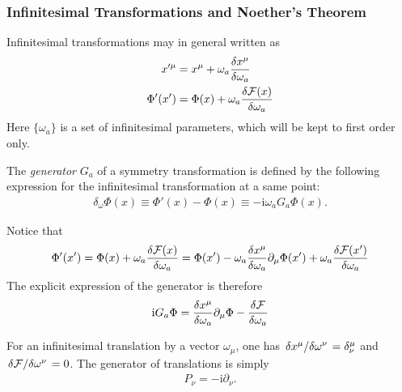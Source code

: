 \documentclass[10pt]{article}
\newcommand{\ii}{\mathrm{i}}
\begin{document}
\subsubsection{Infinitesimal Transformations and Noether's Theorem}
Infinitesimal transformations may in general written as
\begin{align}
    x'^\mu    & =x^\mu+\omega_a\fdv{x^\mu}{\omega_a}\label{eq:CST:x_prime}               \\
    \Phi'(x') & =\Phi(x)+\omega_a \fdv{\mathcal{F}(x)}{\omega_a}\label{eq:CST:phi_prime}
\end{align}
Here $\{\omega_a\}$ is a set of infinitesimal parameters, which will be kept to first order only.
\begin{definition}\label{def:generator_of_a_symmetry_transformation}
    The \textit{generator} $G_a$ of a symmetry transformation is defined by the following expression for the infinitesimal transformation at a same point:
    \begin{align}
        \delta_\omega\Phi(x)\equiv\Phi'(x)-\Phi(x)\equiv-\ii\omega_a G_a\Phi(x).
    \end{align}
\end{definition}
Notice that
\begin{align}
    \Phi'(x')=\Phi(x)+\omega_a \fdv{\mathcal{F}(x)}{\omega_a}=\Phi(x')-\omega_a\fdv{x^\mu}{\omega_a}\partial_\mu\Phi(x')+\omega_a\fdv{\mathcal{F}(x')}{\omega_a}
\end{align}
The explicit expression of the generator is therefore
\begin{align}
    \ii G_a\Phi=\fdv{x^\mu}{\omega_a}\partial_\mu\Phi-\fdv{\mathcal{F}}{\omega_a}\label{eq:CST:explicit_generator}
\end{align}
\begin{example}
    For an infinitesimal translation by a vector $\omega_\mu$, one has $\fdv*{x^\mu}{\omega^\nu}=\delta^\mu_\nu$ and $\fdv*{\mathcal{F}}{\omega^\nu}=0$.
    The generator of translations is simply
    \begin{align}
        P_\nu=-\ii\partial_\nu.\label{eq:CST:translation_operator}
    \end{align}
\end{example}
\end{document}
